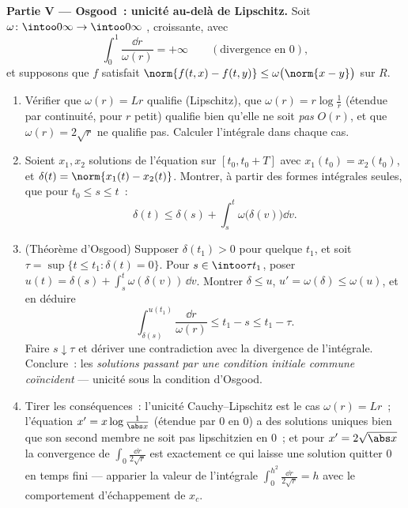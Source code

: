 \begin{problem}[{Problème de fin de semaine --- existence de
solutions de $x' = f(t, x)$ sans Lipschitz}]
\medskip
\noindent\textbf{Partie V --- Osgood~: unicité au-delà de
Lipschitz.} Soit $\omega\colon\intoo0\infty\to\intoo0\infty$
, croissante, avec
\[
\int_0^1\frac{\dd r}{\omega(r)} = +\infty
\qquad(\text{divergence en } 0),
\]
et supposons que $f$ satisfait $\norm{f(t, x) - f(t, y)} \leq
\omega\bigl(\norm{x - y}\bigr)$ sur $R$.
\begin{enumerate}[resume]
  \item Vérifier que $\omega(r) = Lr$ qualifie (Lipschitz), que
        $\omega(r) = r\log\frac1r$ (étendue par continuité,
        pour $r$ petit) qualifie bien qu'elle ne soit
        \emph{pas} $O(r)$, et que $\omega(r) = 2\sqrt r$ ne
        qualifie pas. Calculer l'intégrale dans chaque cas.
  \item Soient $x_1, x_2$ solutions de l'équation sur $[t_0,
        t_0 + T]$ avec $x_1(t_0) = x_2(t_0)$, et $\delta(t) =
        \norm{x_1(t) - x_2(t)}$. Montrer, à partir des formes
        intégrales seules, que pour $t_0 \leq s \leq t$~:
        \[
        \delta(t) \leq \delta(s) +
        \int_s^t\omega\bigl(\delta(v)\bigr)\dd v .
        \]
  \item (Théorème d'Osgood) Supposer $\delta(t_1) > 0$ pour
        quelque $t_1$, et soit $\tau = \sup\{t \leq t_1 :
        \delta(t) = 0\}$. Pour $s \in \intoo\tau{t_1}$, poser
        $u(t) = \delta(s) + \int_s^t\omega(\delta(v))\,\dd v$.
        Montrer $\delta \leq u$, $u' = \omega(\delta) \leq
        \omega(u)$, et en déduire
        \[
        \int_{\delta(s)}^{u(t_1)}\frac{\dd r}{\omega(r)}
        \leq t_1 - s \leq t_1 - \tau .
        \]
        Faire $s \downarrow \tau$ et dériver une contradiction
        avec la divergence de l'intégrale. Conclure~: les
        \emph{solutions passant par une condition initiale
        commune coïncident} --- unicité sous la condition
        d'Osgood.
  \item Tirer les conséquences~: l'unicité Cauchy--Lipschitz
        est le cas $\omega(r) = Lr$~; l'équation $x' =
        x\log\frac1{\abs x}$ (étendue par $0$ en $0$) a des
        solutions uniques bien que son second membre ne soit
        pas lipschitzien en $0$~; et pour $x' = 2\sqrt{\abs x}$
        la convergence de $\int_0\frac{\dd r}{2\sqrt r}$ est
        exactement ce qui laisse une solution quitter $0$ en
        temps fini --- apparier la valeur de l'intégrale
        $\int_0^{h^2}\frac{\dd r}{2\sqrt r} = h$ avec le
        comportement d'échappement de $x_c$.
\end{enumerate}


\end{problem}
